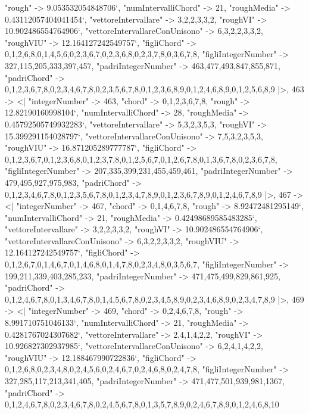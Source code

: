 \documentclass[
]{article}
\begin{document}
\begin{DatasetVerbatim}
    "rough" -> 9.053532054848706`,
    "numIntervalliChord" -> 21,
    "roughMedia" -> 0.43112057404041454`,
    "vettoreIntervallare" -> {3,2,2,3,3,2},
    "roughVI" -> 10.902486554764906`,
    "vettoreIntervallareConUnisono" -> {6,3,2,2,3,3,2},
    "roughVIU" -> 12.164127242549757`,
    "figliChord" -> {{0,1,2,6,8},{0,1,4,5,6},{0,2,3,6,7},{0,2,3,6,8},{0,2,3,7,8},{0,3,6,7,8}},
    "figliIntegerNumber" -> {327,115,205,333,397,457},
    "padriIntegerNumber" -> {463,477,493,847,855,871},
    "padriChord" -> {{0,1,2,3,6,7,8},{0,2,3,4,6,7,8},{0,2,3,5,6,7,8},{0,1,2,3,6,8,9},{0,1,2,4,6,8,9},{0,1,2,5,6,8,9}}
  |>,
  463 -> <|
    "integerNumber" -> 463,
    "chord" -> {0,1,2,3,6,7,8},
    "rough" -> 12.82190160998104`,
    "numIntervalliChord" -> 28,
    "roughMedia" -> 0.45792505749932283`,
    "vettoreIntervallare" -> {5,3,2,3,5,3},
    "roughVI" -> 15.399291154028797`,
    "vettoreIntervallareConUnisono" -> {7,5,3,2,3,5,3},
    "roughVIU" -> 16.871205289777787`,
    "figliChord" -> {{0,1,2,3,6,7},{0,1,2,3,6,8},{0,1,2,3,7,8},{0,1,2,5,6,7},{0,1,2,6,7,8},{0,1,3,6,7,8},{0,2,3,6,7,8}},
    "figliIntegerNumber" -> {207,335,399,231,455,459,461},
    "padriIntegerNumber" -> {479,495,927,975,983},
    "padriChord" -> {{0,1,2,3,4,6,7,8},{0,1,2,3,5,6,7,8},{0,1,2,3,4,7,8,9},{0,1,2,3,6,7,8,9},{0,1,2,4,6,7,8,9}}
  |>,
  467 -> <|
    "integerNumber" -> 467,
    "chord" -> {0,1,4,6,7,8},
    "rough" -> 8.92472481295149`,
    "numIntervalliChord" -> 21,
    "roughMedia" -> 0.42498689585483285`,
    "vettoreIntervallare" -> {3,2,2,3,3,2},
    "roughVI" -> 10.902486554764906`,
    "vettoreIntervallareConUnisono" -> {6,3,2,2,3,3,2},
    "roughVIU" -> 12.164127242549757`,
    "figliChord" -> {{0,1,2,6,7},{0,1,4,6,7},{0,1,4,6,8},{0,1,4,7,8},{0,2,3,4,8},{0,3,5,6,7}},
    "figliIntegerNumber" -> {199,211,339,403,285,233},
    "padriIntegerNumber" -> {471,475,499,829,861,925},
    "padriChord" -> {{0,1,2,4,6,7,8},{0,1,3,4,6,7,8},{0,1,4,5,6,7,8},{0,2,3,4,5,8,9},{0,2,3,4,6,8,9},{0,2,3,4,7,8,9}}
  |>,
  469 -> <|
    "integerNumber" -> 469,
    "chord" -> {0,2,4,6,7,8},
    "rough" -> 8.991710751046133`,
    "numIntervalliChord" -> 21,
    "roughMedia" -> 0.4281767024307682`,
    "vettoreIntervallare" -> {2,4,1,4,2,2},
    "roughVI" -> 10.926827302937985`,
    "vettoreIntervallareConUnisono" -> {6,2,4,1,4,2,2},
    "roughVIU" -> 12.188467990722836`,
    "figliChord" -> {{0,1,2,6,8},{0,2,3,4,8},{0,2,4,5,6},{0,2,4,6,7},{0,2,4,6,8},{0,2,4,7,8}},
    "figliIntegerNumber" -> {327,285,117,213,341,405},
    "padriIntegerNumber" -> {471,477,501,939,981,1367},
    "padriChord" -> {{0,1,2,4,6,7,8},{0,2,3,4,6,7,8},{0,2,4,5,6,7,8},{0,1,3,5,7,8,9},{0,2,4,6,7,8,9},{0,1,2,4,6,8,10}}

\end{DatasetVerbatim}
\end{document}
